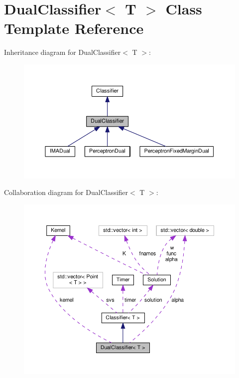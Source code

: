 \hypertarget{class_dual_classifier}{}\section{Dual\+Classifier$<$ T $>$ Class Template Reference}
\label{class_dual_classifier}


Inheritance diagram for Dual\+Classifier$<$ T $>$\+:
\nopagebreak
\begin{figure}[H]
\begin{center}
\leavevmode
\includegraphics[width=350pt]{class_dual_classifier__inherit__graph}
\end{center}
\end{figure}


Collaboration diagram for Dual\+Classifier$<$ T $>$\+:
\nopagebreak
\begin{figure}[H]
\begin{center}
\leavevmode
\includegraphics[width=350pt]{class_dual_classifier__coll__graph}
\end{center}
\end{figure}
